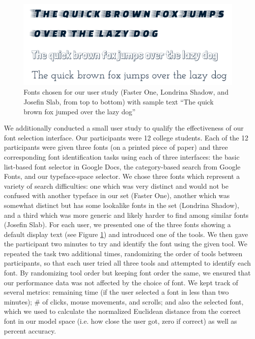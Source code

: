 \begin{figure}[h]
    \centering
    \includegraphics[width=\textwidth]{images/user-fonts.pdf}
    \caption{Fonts chosen for our user study (Faster One, Londrina Shadow, and Josefin Slab, from top to bottom) with sample text ``The quick brown fox jumped over the lazy dog''}
    \label{fig:user-fonts}
\end{figure}

We additionally conducted a small user study to qualify the effectiveness of our font selection interface. Our participants were 12 college students. Each of the 12 participants were given three fonts (on a printed piece of paper) and three corresponding font identification tasks using each of three interfaces: the basic list-based font selector in Google Docs, the category-based search from Google Fonts, and our typeface-space selector. We chose three fonts which represent a variety of search difficulties: one which was very distinct and would not be confused with another typeface in our set (Faster One), another which was somewhat distinct but has some lookalike fonts in the set (Londrina Shadow), and a third which was more generic and likely harder to find among similar fonts (Josefin Slab). For each user, we presented one of the three fonts showing a default display text (see Figure \ref{fig:user-fonts}) and introduced one of the tools. We then gave the participant two minutes to try and identify the font using the given tool. We repeated the task two additional times, randomizing the order of tools between participants, so that each user tried all three tools and attempted to identify each font. By randomizing tool order but keeping font order the same, we ensured that our performance data was not affected by the choice of font. We kept track of several metrics: remaining time (if the user selected a font in less than two minutes); \# of clicks, mouse movements, and scrolls; and also the selected font, which we used to calculate the normalized Euclidean distance from the correct font in our model space (i.e. how close the user got, zero if correct) as well as percent accuracy.

